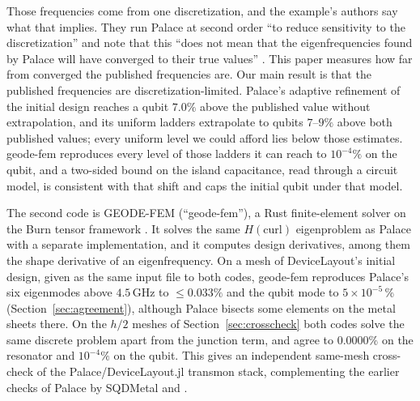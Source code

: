 \documentclass{anvil-paper}
\begin{document}
Those frequencies come from one discretization, and the example's authors
say what that implies. They run Palace at second order ``to reduce
sensitivity to the discretization'' and note that this ``does not mean that
the eigenfrequencies found by Palace will have converged to their true
values'' \citep{devicelayout-example}. This paper measures
how far from converged the published frequencies are. Our
main result is that the published frequencies are discretization-limited.
Palace's adaptive refinement of the initial design reaches a qubit $7.0\%$ above the
published value without extrapolation, and its uniform ladders extrapolate
to qubits $7$--$9\%$ above both published values; every uniform level we
could afford lies below those estimates. geode-fem reproduces every
level of those ladders it can reach to $10^{-4}\%$ on the qubit, and a
two-sided bound on the island capacitance, read through a circuit model, is
consistent with that shift and caps the initial qubit under that model.

The second code is GEODE-FEM (``geode-fem''), a Rust finite-element solver
on the Burn tensor framework \citep{burn}. It solves the same
$H(\mathrm{curl})$ eigenproblem as Palace with a separate implementation,
and it computes design derivatives, among them the shape derivative of an
eigenfrequency. On a mesh of DeviceLayout's initial design, given as the
same input file to both codes, geode-fem reproduces Palace's six eigenmodes above $4.5$\,GHz to
$\leq 0.033\%$ and the qubit mode to $5\times10^{-5}\,\%$
(Section~\ref{sec:agreement}), although Palace bisects some elements on
the metal sheets there. On the $h/2$ meshes of
Section~\ref{sec:crosscheck} both codes solve the same discrete problem
apart from the junction term, and agree to $0.0000\%$ on the resonator and
$10^{-4}\%$ on the qubit. This gives an independent
same-mesh cross-check of the Palace/DeviceLayout.jl transmon stack,
complementing the earlier checks of Palace by SQDMetal
\citep{sommers2025open} and \citet{ye2025electromagnetic}.
\end{document}
